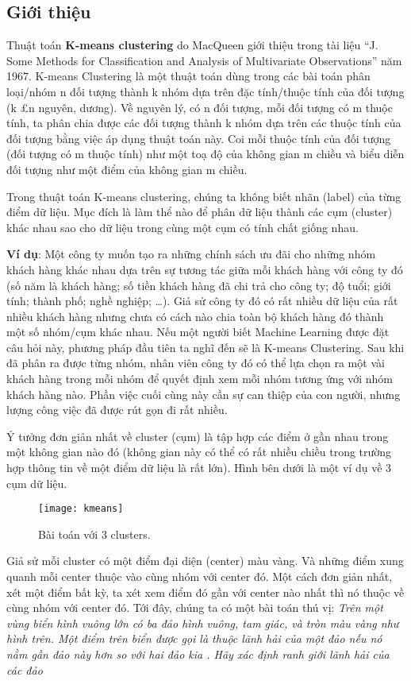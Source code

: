 \subsection{Giới thiệu}
Thuật toán \textbf{K-means clustering} \cite{kmeans} do MacQueen giới thiệu trong tài liệu “J. Some Methods for Classification and Analysis of Multivariate Observations” năm 1967.
K-means Clustering là một thuật toán dùng trong các bài toán phân loại/nhóm n đối tượng thành k nhóm dựa trên đặc tính/thuộc tính của đối tượng (k £n nguyên, dương).
Về nguyên lý, có n đối tượng, mỗi đối tượng có m thuộc tính, ta phân chia được các đối tượng thành k nhóm dựa trên các thuộc tính của đối tượng bằng việc áp dụng thuật toán này.
Coi mỗi thuộc tính của đối tượng (đối tượng có m thuộc tính) như một toạ độ của không gian m chiều và biểu diễn đối tượng như một điểm của không gian m chiều. 
\par
Trong thuật toán K-means clustering, chúng ta không biết nhãn (label) của từng điểm dữ liệu. 
Mục đích là làm thể nào để phân dữ liệu thành các cụm (cluster) khác nhau sao cho dữ liệu trong cùng một cụm có tính chất giống nhau.
\par
\textbf{Ví dụ}: Một công ty muốn tạo ra những chính sách ưu đãi cho những nhóm khách hàng khác nhau dựa trên sự tương tác giữa mỗi khách hàng với công ty đó (số năm là khách hàng; số tiền khách hàng đã chi trả cho công ty; độ tuổi; giới tính; thành phố; nghề nghiệp; …). 
Giả sử công ty đó có rất nhiều dữ liệu của rất nhiều khách hàng nhưng chưa có cách nào chia toàn bộ khách hàng đó thành một số nhóm/cụm khác nhau. 
Nếu một người biết Machine Learning được đặt câu hỏi này, phương pháp đầu tiên ta nghĩ đến sẽ là K-means Clustering. 
Sau khi đã phân ra được từng nhóm, nhân viên công ty đó có thể lựa chọn ra một vài khách hàng trong mỗi nhóm để quyết định xem mỗi nhóm tương ứng với nhóm khách hàng nào. 
Phần việc cuối cùng này cần sự can thiệp của con người, nhưng lượng công việc đã được rút gọn đi rất nhiều.
\par
Ý tưởng đơn giản nhất về cluster (cụm) là tập hợp các điểm ở gần nhau trong một không gian nào đó (không gian này có thể có rất nhiều chiều trong trường hợp thông tin về một điểm dữ liệu là rất lớn). 
Hình bên dưới là một ví dụ về 3 cụm dữ liệu.
\begin{figure}[!htbp]
    \centering
    \texttt{[image: kmeans]}
    \caption{Bài toán với 3 clusters.}
    \label{fig:x cubed graph}
\end{figure}
\FloatBarrier
Giả sử mỗi cluster có một điểm đại diện (center) màu vàng. Và những điểm xung quanh mỗi center thuộc vào cùng nhóm với center đó. Một cách đơn giản nhất, xét một điểm bất kỳ, ta xét xem điểm đó gần với center nào nhất thì nó thuộc về cùng nhóm với center đó. Tới đây, chúng ta có một bài toán thú vị: \textit{Trên một vùng biển hình vuông lớn có ba đảo hình vuông, tam giác, và tròn màu vàng như hình trên. Một điểm trên biển được gọi là thuộc lãnh hải của một đảo nếu nó nằm gần đảo này hơn so với hai đảo kia . Hãy xác định ranh giới lãnh hải của các đảo}
